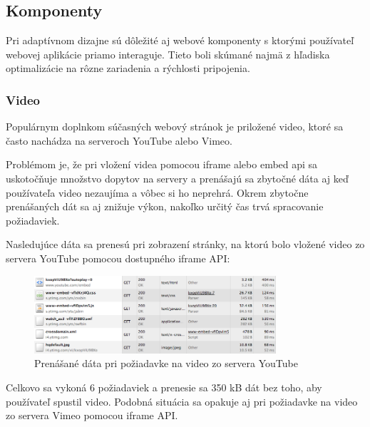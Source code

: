 

\subsection{Komponenty} %
\label{sub:komponenty}

Pri adaptívnom dizajne sú dôležité aj webové komponenty s ktorými používateľ webovej aplikácie priamo interaguje. Tieto boli skúmané najmä z hľadiska optimalizácie na rôzne zariadenia a rýchlosti pripojenia.

\subsubsection{Video} %
\label{subsub:video}

Populárnym doplnkom súčasných webový stránok je priložené video, ktoré sa často nachádza na serveroch YouTube alebo Vimeo.

Problémom je, že pri vložení videa pomocou iframe alebo embed api sa uskotočňuje množstvo dopytov na servery a prenášajú sa zbytočné dáta aj keď používateľa video nezaujíma a vôbec si ho neprehrá. Okrem zbytočne prenášaných dát sa aj znižuje výkon, nakoľko určitý čas trvá spracovanie požiadaviek.

Nasledujúce dáta sa prenesú pri zobrazení stránky, na ktorú bolo vložené video zo servera YouTube pomocou dostupného iframe API:

\begin{figure}[H]
	\centering
	\includegraphics[width=0.8\textwidth]{img/youtube.png}
	\caption[Prenášané dáta pri požiadavke na video zo servera YouTube]{
		Prenášané dáta pri požiadavke na video zo servera YouTube}
	\label{fig: youtube}
\end{figure}

Celkovo sa vykoná 6 požiadaviek a prenesie sa 350 kB dát bez toho, aby používateľ spustil video. Podobná situácia sa opakuje aj pri požiadavke na video zo servera Vimeo pomocou iframe API.


